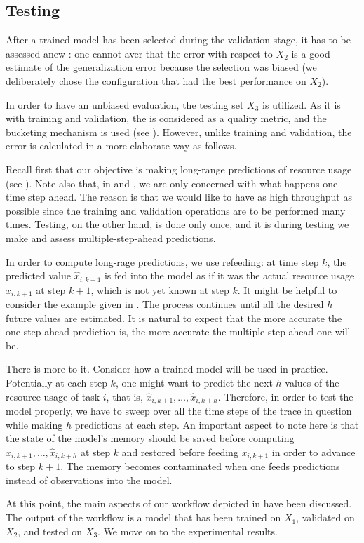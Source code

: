 \subsection{Testing} 
After a trained model has been selected during the validation stage, it has to
be assessed anew \cite{hastie2009}: one cannot aver that the error with respect
to $X_2$ is a good estimate of the generalization error because the selection
was biased (we deliberately chose the configuration that had the best
performance on $X_2$).

In order to have an unbiased evaluation, the testing set $X_3$ is utilized. As
it is with training and validation, the  is considered as a quality
metric, and the bucketing mechanism is used (see ). However,
unlike training and validation, the error is calculated in a more elaborate way
as follows.

Recall first that our objective is making long-range predictions of resource
usage (see ). Note also that, in  and
, we are only concerned with what happens one time step ahead.
The reason is that we would like to have as high throughput as possible since
the training and validation operations are to be performed many times. Testing,
on the other hand, is done only once, and it is during testing we make and
assess multiple-step-ahead predictions.

In order to compute long-rage predictions, we use refeeding: at time step $k$,
the predicted value $\hat{x}_{i,k + 1}$ is fed into the model as if it was the
actual resource usage $x_{i,k + 1}$ at step $k + 1$, which is not yet known at
step $k$. It might be helpful to consider the example given in .
The process continues until all the desired $h$ future values are estimated. It
is natural to expect that the more accurate the one-step-ahead prediction is,
the more accurate the multiple-step-ahead one will be.

There is more to it. Consider how a trained model will be used in practice.
Potentially at each step $k$, one might want to predict the next $h$ values of
the resource usage of task $i$, that is, $\hat{x}_{i,k + 1}, \dots, \hat{x}_{i,k
+ h}$. Therefore, in order to test the model properly, we have to sweep over all
the time steps of the trace in question while making $h$ predictions at each
step. An important aspect to note here is that the state of the model's memory
should be saved before computing $\hat{x}_{i,k + 1}, \dots, \hat{x}_{i,k + h}$
at step $k$ and restored before feeding $x_{i,k + 1}$ in order to advance to
step $k + 1$. The memory becomes contaminated when one feeds predictions instead
of observations into the model.

At this point, the main aspects of our workflow depicted in  have
been discussed. The output of the workflow is a model that has been trained on
$X_1$, validated on $X_2$, and tested on $X_3$. We move on to the experimental
results.
